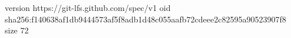 version https://git-lfs.github.com/spec/v1
oid sha256:f140638af1db9444573af5f8adb1d48c055aafb72cdeee2c82595a90523907f8
size 72
